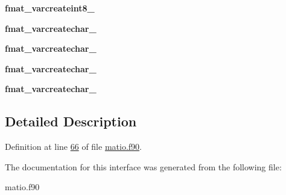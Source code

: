 \begin{DoxyCompactItemize}
{\bfseries fmat\+\_\+varcreateint8\+\_}
\item 
\mbox{\label{interfacematio_1_1fmat__varcreate_add6205098b8be188038d051596998457}} 
{\bfseries fmat\+\_\+varcreatechar\+\_}
\item 
\mbox{\label{interfacematio_1_1fmat__varcreate_a4c1601e08e877cc0c0aa34bcee81e50e}} 
{\bfseries fmat\+\_\+varcreatechar\+\_}
\item 
\mbox{\label{interfacematio_1_1fmat__varcreate_a6b254e70d8646ea0d66a33d4c8861742}} 
{\bfseries fmat\+\_\+varcreatechar\+\_}
\item 
\mbox{\label{interfacematio_1_1fmat__varcreate_acb57d2e4e3c99aa8fec9d3c6eaa6c577}} 
{\bfseries fmat\+\_\+varcreatechar\+\_}
\end{DoxyCompactItemize}


\subsection{Detailed Description}


Definition at line \hyperlink{matio_8f90_source_l00066}{66} of file \hyperlink{matio_8f90_source}{matio.\+f90}.



The documentation for this interface was generated from the following file\+:\begin{DoxyCompactItemize}
\item 
matio.\+f90\end{DoxyCompactItemize}
